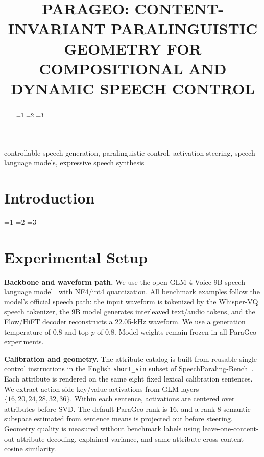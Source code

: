 \documentclass{article}
\title{PARAGEO: CONTENT-INVARIANT PARALINGUISTIC GEOMETRY FOR COMPOSITIONAL AND DYNAMIC SPEECH CONTROL}
\def\ABSTRACTOPTION{1}
\def\INTROOPTION{1}
\begin{document}
\maketitle

\begin{abstract}
\ifnum\ABSTRACTOPTION=1 \AbstractA\fi
\ifnum\ABSTRACTOPTION=2 \AbstractB\fi
\ifnum\ABSTRACTOPTION=3 \AbstractC\fi
\end{abstract}

\begin{keywords}
controllable speech generation, paralinguistic control, activation steering, speech language models, expressive speech synthesis
\end{keywords}

\section{Introduction}
\label{sec:intro}
\ifnum\INTROOPTION=1 \IntroA\fi
\ifnum\INTROOPTION=2 \IntroB\fi
\ifnum\INTROOPTION=3 \IntroC\fi


\section{Experimental Setup}
\label{sec:setup}

\textbf{Backbone and waveform path.}
We use the open GLM-4-Voice-9B speech language model~\cite{zeng2024glm4voice} with NF4/int4 quantization. All benchmark examples follow the model's official speech path: the input waveform is tokenized by the Whisper-VQ speech tokenizer, the 9B model generates interleaved text/audio tokens, and the Flow/HiFT decoder reconstructs a 22.05-kHz waveform. We use a generation temperature of 0.8 and top-$p$ of 0.8. Model weights remain frozen in all ParaGeo experiments.

\textbf{Calibration and geometry.}
The attribute catalog is built from reusable single-control instructions in the English \texttt{short\_sin} subset of SpeechParaling-Bench~\cite{liu2026speechparaling}. Each attribute is rendered on the same eight fixed lexical calibration sentences. We extract action-side key/value activations from GLM layers $\{16,20,24,28,32,36\}$. Within each sentence, activations are centered over attributes before SVD. The default ParaGeo rank is 16, and a rank-8 semantic subspace estimated from sentence means is projected out before steering. Geometry quality is measured without benchmark labels using leave-one-content-out attribute decoding, explained variance, and same-attribute cross-content cosine similarity.
\end{document}
